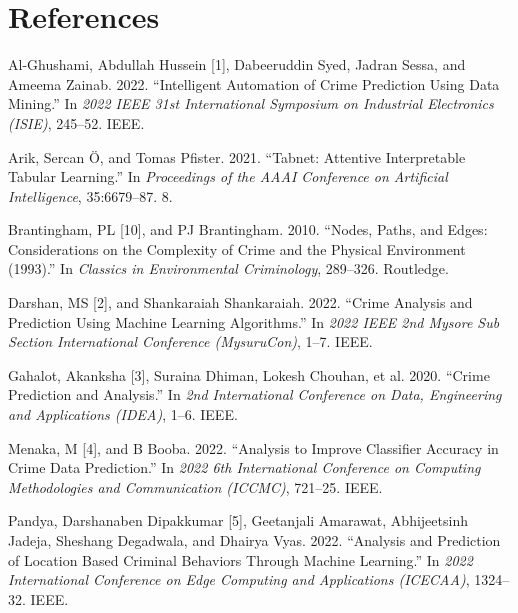 \documentclass[conference,final,]{IEEEtran}
\newlength{\cslhangindent}
\newenvironment{CSLReferences}[2] %
 {\begin{list}{}{%
  \setlength{\itemindent}{0pt}
  \setlength{\leftmargin}{0pt}
  \setlength{\parsep}{0pt}
  \ifodd #1
   \setlength{\leftmargin}{\cslhangindent}
   \setlength{\itemindent}{-1\cslhangindent}
  \fi
  \setlength{\itemsep}{#2\baselineskip}}}
 {\end{list}}
\begin{document}
\section*{References}\label{references}

\label{refs}
\begin{CSLReferences}{1}{0}
Al-Ghushami, Abdullah Hussein {[}1{]}, Dabeeruddin Syed, Jadran Sessa,
and Ameema Zainab. 2022. {``Intelligent Automation of Crime Prediction
Using Data Mining.''} In \emph{2022 IEEE 31st International Symposium on
Industrial Electronics (ISIE)}, 245--52. IEEE.

Arik, Sercan Ö, and Tomas Pfister. 2021. {``Tabnet: Attentive
Interpretable Tabular Learning.''} In \emph{Proceedings of the AAAI
Conference on Artificial Intelligence}, 35:6679--87. 8.

Brantingham, PL {[}10{]}, and PJ Brantingham. 2010. {``Nodes, Paths, and
Edges: Considerations on the Complexity of Crime and the Physical
Environment (1993).''} In \emph{Classics in Environmental Criminology},
289--326. Routledge.

Darshan, MS {[}2{]}, and Shankaraiah Shankaraiah. 2022. {``Crime
Analysis and Prediction Using Machine Learning Algorithms.''} In
\emph{2022 IEEE 2nd Mysore Sub Section International Conference
(MysuruCon)}, 1--7. IEEE.

Gahalot, Akanksha {[}3{]}, Suraina Dhiman, Lokesh Chouhan, et al. 2020.
{``Crime Prediction and Analysis.''} In \emph{2nd International
Conference on Data, Engineering and Applications (IDEA)}, 1--6. IEEE.

Menaka, M {[}4{]}, and B Booba. 2022. {``Analysis to Improve Classifier
Accuracy in Crime Data Prediction.''} In \emph{2022 6th International
Conference on Computing Methodologies and Communication (ICCMC)},
721--25. IEEE.

Pandya, Darshanaben Dipakkumar {[}5{]}, Geetanjali Amarawat,
Abhijeetsinh Jadeja, Sheshang Degadwala, and Dhairya Vyas. 2022.
{``Analysis and Prediction of Location Based Criminal Behaviors Through
Machine Learning.''} In \emph{2022 International Conference on Edge
Computing and Applications (ICECAA)}, 1324--32. IEEE.


\end{CSLReferences}
\end{document}
